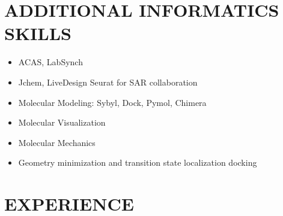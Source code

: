 \documentclass[margin, 10pt]{res} %
\begin{document}
\begin{resume}
\section{ADDITIONAL INFORMATICS \\ SKILLS} 
\begin{itemize}[leftmargin=*, label={}, noitemsep, labelindent=-5pt,itemindent=-50pt]
\item ACAS, LabSynch 
\item Jchem, LiveDesign Seurat for SAR collaboration
\item Molecular Modeling: Sybyl, Dock, Pymol, Chimera
\item Molecular Visualization
\item Molecular Mechanics
\item Geometry minimization and transition state localization docking 
\end{itemize} 


\section{EXPERIENCE}


\end{resume}
\end{document}
